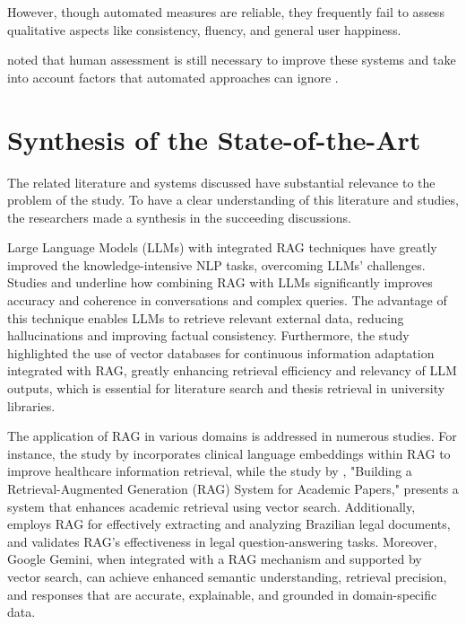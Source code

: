 \begin{refsection}
\hspace{0.4cm}However, though automated measures are reliable, they frequently fail to assess qualitative aspects like consistency, fluency, and general user happiness.

\newpage
\clearpage
\citeauthor{sivasothy2024ragprobe} \citeyear{sivasothy2024ragprobe} noted that human assessment is still necessary to improve these systems and take into account factors that automated approaches can ignore \cite{sivasothy2024ragprobe}.

\section{Synthesis of the State-of-the-Art}

\hspace{1cm}The related literature and systems discussed have substantial relevance to the problem of the study. To have a clear understanding of this literature and studies, the researchers made a synthesis in the succeeding discussions.


\hspace{0.4cm}Large Language Models (LLMs) with integrated RAG techniques have greatly improved the knowledge-intensive NLP tasks, overcoming LLMs' challenges. Studies \cite{thapa2022splitfed} and \cite{thomo2024pubmed} underline how combining RAG with LLMs significantly improves accuracy and coherence in conversations and complex queries. The advantage of this technique enables LLMs to retrieve relevant external data, reducing hallucinations and improving factual consistency. Furthermore, the study \cite{lewis2020retrieval} highlighted the use of vector databases for continuous information adaptation integrated with RAG, greatly enhancing retrieval efficiency and relevancy of LLM outputs, which is essential for literature search and thesis retrieval in university libraries.


\hspace{0.4cm}The application of RAG in various domains is addressed in numerous studies. For instance, the study by \citeauthor{arzideh2024miracle} \citeyear{arzideh2024miracle} incorporates clinical language embeddings within RAG to improve healthcare information retrieval, while the study by \citeauthor{grigoryan2024building} \citeyear{grigoryan2024building}, "Building a Retrieval-Augmented Generation (RAG) System for Academic Papers," presents a system that enhances academic retrieval using vector search. Additionally, \citeauthor{aquino2024extracting} \citeyear{aquino2024extracting} employs RAG for effectively extracting and analyzing Brazilian legal documents, and \citeauthor{ryu2023retrieval} \citeyear{ryu2023retrieval} validates RAG’s effectiveness in legal question-answering tasks. Moreover, Google Gemini, when integrated with a RAG mechanism and supported by vector search, can achieve enhanced semantic understanding, retrieval precision, and responses that are accurate, explainable, and grounded in domain-specific data.


\end{refsection}
